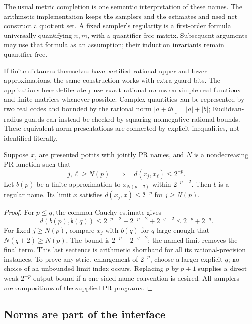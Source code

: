 The usual metric completion is one semantic interpretation of these names.
The arithmetic implementation keeps the samplers and the estimates and
need not construct a quotient set. A fixed sampler's regularity is a
first-order formula universally quantifying $n,m$, with a quantifier-free
matrix. Subsequent arguments may use that formula as an assumption; their
induction invariants remain quantifier-free.

If finite distances themselves have certified rational upper and lower
approximations, the same construction works with extra guard bits. The
applications here deliberately use exact rational norms on simple real
functions and finite matrices whenever possible. Complex quantities can be
represented by two real codes and bounded by the rational norm
$|a+ib|_\square=|a|+|b|$; Euclidean-radius guards can instead be checked by
squaring nonnegative rational bounds. These equivalent norm presentations
are connected by explicit inequalities, not identified literally.

\begin{lemma}\label{lem:diagonal}
Suppose $x_j$ are presented points with jointly PR names, and $N$ is a
nondecreasing PR function such that
\[
 j,\ell\ge N(p)\quad\Longrightarrow\quad d(x_j,x_\ell)\le2^{-p}.
\]
Let $b(p)$ be a finite approximation to $x_{N(p+2)}$ within $2^{-p-2}$.
Then $b$ is a regular name. Its limit $x$ satisfies
$d(x_j,x)\le2^{-p}$ for $j\ge N(p)$.
\end{lemma}
\begin{proof}
For $p\le q$, the common Cauchy estimate gives
\[
 d(b(p),b(q))\le2^{-p-2}+2^{-p-2}+2^{-q-2}
 \le2^{-p}+2^{-q}.
\]
For fixed $j\ge N(p)$, compare $x_j$ with $b(q)$ for $q$ large enough that
$N(q+2)\ge N(p)$. The bound is $2^{-p}+2^{-q-2}$; the named limit removes
the final term. This last sentence is arithmetic shorthand for all its
rational-precision instances. To prove any strict enlargement of $2^{-p}$,
choose a larger explicit $q$; no choice of an unbounded limit index occurs.
Replacing $p$ by $p+1$ supplies a direct weak $2^{-p}$ output bound if a
one-sided name convention is desired. All samplers are compositions of
the supplied PR programs.
\end{proof}

\subsection{Norms are part of the interface}

